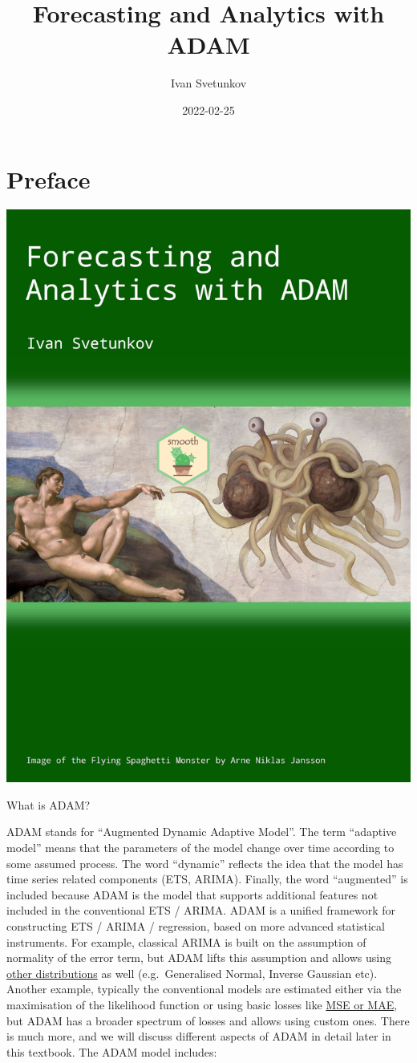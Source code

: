 \documentclass[
]{book}
\title{Forecasting and Analytics with ADAM}
\author{Ivan Svetunkov}
\date{2022-02-25}
\theoremstyle{definition}
\theoremstyle{definition}
\theoremstyle{definition}
\theoremstyle{definition}
\theoremstyle{remark}
\begin{document}
\maketitle

{
\setcounter{tocdepth}{1}
\tableofcontents
}
\hypertarget{preface}{%
\chapter*{Preface}\label{preface}}

\begin{center}\includegraphics[width=0.6\linewidth]{images/Adam-Title-web} \end{center}

What is ADAM?

ADAM stands for ``Augmented Dynamic Adaptive Model''. The term ``adaptive model'' means that the parameters of the model change over time according to some assumed process. The word ``dynamic'' reflects the idea that the model has time series related components (ETS, ARIMA). Finally, the word ``augmented'' is included because ADAM is the model that supports additional features not included in the conventional ETS / ARIMA. ADAM is a unified framework for constructing ETS / ARIMA / regression, based on more advanced statistical instruments. For example, classical ARIMA is built on the assumption of normality of the error term, but ADAM lifts this assumption and allows using \protect\hyperlink{distributions}{other distributions} as well (e.g.~Generalised Normal, Inverse Gaussian etc). Another example, typically the conventional models are estimated either via the maximisation of the likelihood function or using basic losses like \protect\hyperlink{errorMeasures}{MSE or MAE}, but ADAM has a broader spectrum of losses and allows using custom ones. There is much more, and we will discuss different aspects of ADAM in detail later in this textbook. The ADAM model includes:
\end{document}
